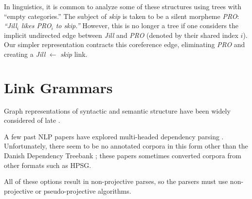 \documentclass[a4paper,11pt]{article}
\newcommand{\Note}[4][]{\todo[author=#2,color=#3,fancyline,#1]{#4}}
\newcommand{\noteJE}[2][]{\Note[#1]{JE}{green!40}{#2}}
\newcommand{\NoteJE}[2][]{\noteJE[inline,#1]{#2}}
\begin{document}
In linguistics, it is common to analyze some of these structures using trees with ``empty categories.''  The subject of {\em skip} is taken to be a silent morpheme {\em PRO}:
{\em ``Jill$_i$ likes PRO$_i$ to skip.''}  However, this is no longer a tree if one considers the implicit undirected edge between {\em Jill} and {\em PRO} (denoted by their shared index $i$).  Our simpler representation contracts this coreference edge, eliminating {\em PRO} and creating a {\em Jill} $\leftarrow$ {\em skip} link.  

\section{Link Grammars}

Graph representations of syntactic and semantic structure have been widely considered of late \cite{demarneffe-manning-2008,ivanova-et-al-2012,AMR-2013,oepen-et-al-2014}.

A few past NLP papers have explored multi-headed dependency parsing \cite{buchkromann-2006,mcdonald-pereira-2006,sagae-tsujii-2008,gomezrodriguez-nivre-2013}.  Unfortunately, there seem to be no annotated corpora in this form other than the Danish Dependency Treebank \cite{kromann-2003}; these papers  sometimes converted corpora from other formats such as HPSG.


All of these options result in non-projective parses, so the parsers must use non-projective or pseudo-projective algorithms.
\end{document}
